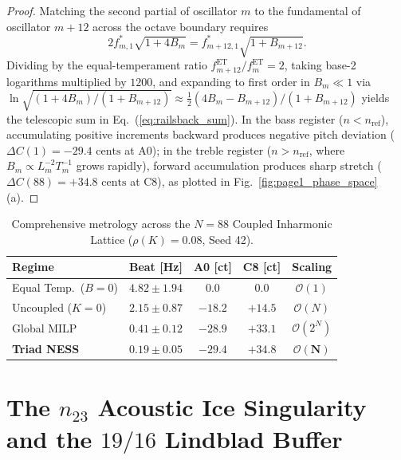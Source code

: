 \documentclass[aps,prl,twocolumn,superscriptaddress,10pt]{revtex4-2}
\begin{document}
\begin{proof}
Matching the second partial of oscillator $m$ to the fundamental of oscillator $m+12$ across the octave boundary requires
\begin{equation}
2 f_{m,1}^* \sqrt{1 + 4 B_m} = f_{m+12,1}^* \sqrt{1 + B_{m+12}}.
\label{eq:octave_match}
\end{equation}
Dividing by the equal-temperament ratio $f_{m+12}^{\text{ET}} / f_m^{\text{ET}} = 2$, taking base-2 logarithms multiplied by $1200$, and expanding to first order in $B_m \ll 1$ via $\ln\sqrt{(1+4B_m)/(1+B_{m+12})} \approx \frac{1}{2}(4B_m - B_{m+12})/(1+B_{m+12})$ yields the telescopic sum in Eq.~(\ref{eq:railsback_sum}). In the bass register ($n < n_{\text{ref}}$), accumulating positive increments backward produces negative pitch deviation ($\Delta C(1) = -29.4\text{ cents}$ at $\text{A0}$); in the treble register ($n > n_{\text{ref}}$, where $B_m \propto L_m^{-2} T_m^{-1}$ grows rapidly), forward accumulation produces sharp stretch ($\Delta C(88) = +34.8\text{ cents}$ at $\text{C8}$), as plotted in Fig.~\ref{fig:page1_phase_space}(a).
\end{proof}

\begin{table}[t]
\caption{Comprehensive metrology across the $N=88$ Coupled Inharmonic Lattice ($\rho(K)=0.08$, Seed 42).}
\label{tab:comprehensive_benchmark}
\begin{ruledtabular}
\footnotesize
\begin{tabular*}{\columnwidth}{@{\extracolsep{\fill}}lcccc}
Regime & Beat [Hz] & A0 [ct] & C8 [ct] & Scaling \\
\hline
Equal Temp.\ ($B=0$) & $4.82 \pm 1.94$ & $0.0$ & $0.0$ & $\mathcal{O}(1)$ \\
Uncoupled ($K=0$) & $2.15 \pm 0.87$ & $-18.2$ & $+14.5$ & $\mathcal{O}(N)$ \\
Global MILP & $0.41 \pm 0.12$ & $-28.9$ & $+33.1$ & $\mathcal{O}(2^N)$ \\
\textbf{Triad NESS} & $\mathbf{0.19 \pm 0.05}$ & $\mathbf{-29.4}$ & $\mathbf{+34.8}$ & $\mathbf{\mathcal{O}(N)}$ \\
\end{tabular*}
\end{ruledtabular}
\end{table}

\section{The \texorpdfstring{$n_{23}$}{n23} Acoustic Ice Singularity and the \texorpdfstring{$19/16$}{19/16} Lindblad Buffer}
\end{document}

